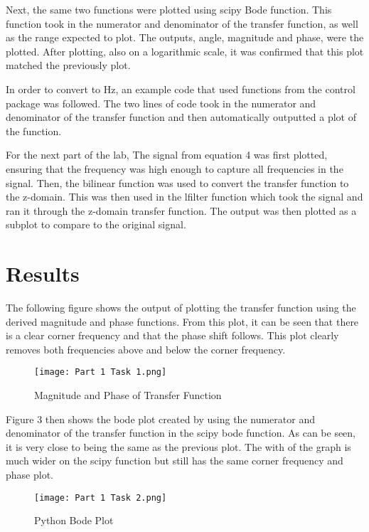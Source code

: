 \documentclass[12pt, titlepage]{article}
\begin{document}
    Next, the same two functions were plotted using scipy Bode function.  This function took in the numerator and denominator of the transfer function, as well as the range expected to plot.  The outputs, angle, magnitude and phase, were the plotted.  After plotting, also on a logarithmic scale, it was confirmed that this plot matched the previously plot.
    
    In order to convert to Hz, an example code that used functions from the control package was followed.  The two lines of code took in the numerator and denominator of the transfer function and then automatically outputted a plot of the function.
    
    For the next part of the lab, The signal from equation 4 was first plotted, ensuring that the frequency was high enough to capture all frequencies in the signal.  Then, the bilinear function was used to convert the transfer function to the z-domain.  This was then used in the lfilter function which took the signal and ran it through the z-domain transfer function.  The output was then plotted as a subplot to compare to the original signal.
   
    \section{Results}
    The following figure shows the output of plotting the transfer function using the derived magnitude and phase functions.  From this plot, it can be seen that there is a clear corner frequency and that the phase shift follows.  This plot clearly removes both frequencies above and below the corner frequency.  
    
    \clearpage
    \begin{figure}
        \centering
        \texttt{[image: Part 1 Task 1.png]}
        \caption{Magnitude and Phase of Transfer Function}
        \label{fig:my_label}
    \end{figure}
    
    Figure 3 then shows the bode plot created by using the numerator and denominator of the transfer function in the scipy bode function.  As can be seen, it is very close to being the same as the previous plot.  The with of the graph is much wider on the scipy function but still has the same corner frequency and phase plot.
    \clearpage
    \begin{figure}[h!]
        \centering
        \texttt{[image: Part 1 Task 2.png]}
        \caption{Python Bode Plot}
        \label{fig:my_label}
    \end{figure}
    
\end{document}
